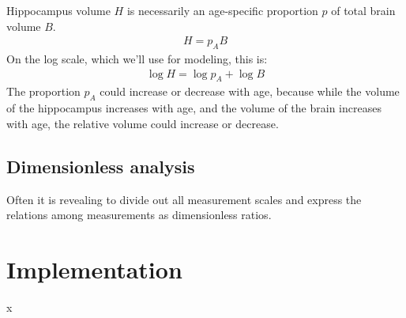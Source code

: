 \documentclass[reqno ,11pt]{amsart}
\begin{document}
Hippocampus volume $H$ is necessarily an age-specific proportion $p$ of total brain volume $B$.
\begin{align}
H = p_A B
\end{align}
On the log scale, which we'll use for modeling, this is:
\begin{align*}
\log H = \log p_A + \log B
\end{align*}
The proportion $p_A$ could increase or decrease with age, because while the volume of the hippocampus increases with age, and the volume of the brain increases with age, the relative volume could increase or decrease. 


\subsection{Dimensionless analysis}

Often it is revealing to divide out all measurement scales and express the relations among measurements as dimensionless ratios.


\section{Implementation}

x


\clearpage
 

\end{document}
